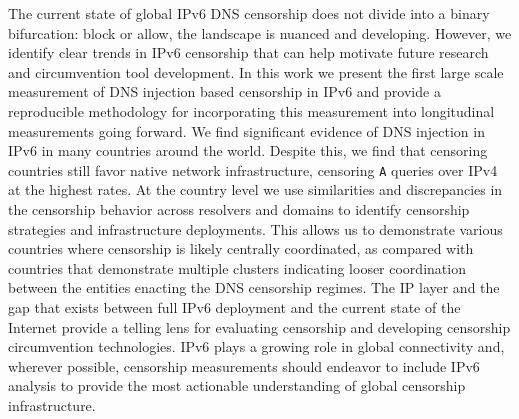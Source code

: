 The current state of global IPv6 DNS censorship does not divide into a binary
bifurcation: block or allow, the landscape is nuanced and developing. However, we
identify clear trends in IPv6 censorship that can help motivate future research
and circumvention tool development.
%
In this work we present the first large scale measurement of DNS injection based
censorship in IPv6 and provide a reproducible methodology for incorporating this
measurement into longitudinal measurements going forward. We find significant
evidence of DNS injection in IPv6 in many countries around the world. Despite
this, we find that censoring countries still favor native network
infrastructure, censoring \texttt{A} queries over IPv4 at the highest rates. At
the country level we use similarities and discrepancies in the censorship
behavior across resolvers and domains to identify censorship strategies and
infrastructure deployments. This allows us to demonstrate various countries
where censorship is likely centrally coordinated, as compared with countries
that demonstrate multiple clusters indicating looser coordination between the
entities enacting the DNS censorship regimes.
%
The IP layer and the gap that exists between full IPv6 deployment and the
current state of the Internet provide a telling lens for evaluating censorship
and developing censorship circumvention technologies. IPv6 plays a growing role
in global connectivity and, wherever possible, censorship measurements should
endeavor to include IPv6 analysis to provide the most actionable understanding
of global censorship infrastructure.
